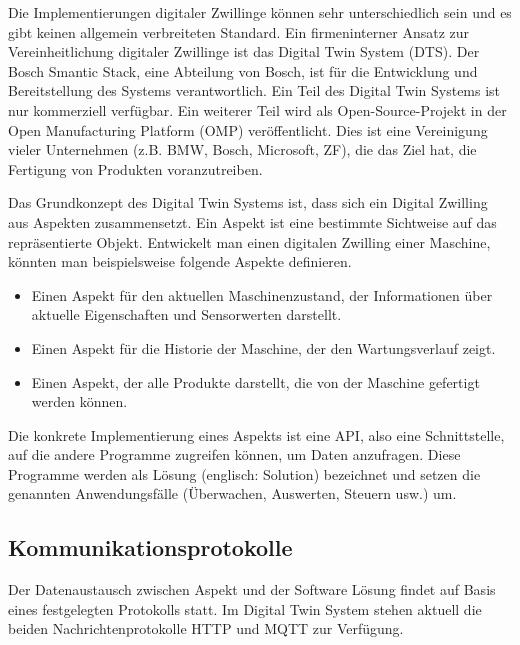 Die Implementierungen digitaler Zwillinge können sehr unterschiedlich sein und es gibt keinen allgemein verbreiteten Standard. Ein firmeninterner Ansatz zur Vereinheitlichung digitaler Zwillinge ist das Digital Twin System (DTS). Der Bosch Smantic Stack, eine Abteilung von Bosch, ist für die Entwicklung und Bereitstellung des Systems verantwortlich. Ein Teil des Digital Twin Systems ist nur kommerziell verfügbar. Ein weiterer Teil wird als Open-Source-Projekt in der Open Manufacturing Platform (OMP) veröffentlicht. Dies ist eine Vereinigung vieler Unternehmen (z.B. BMW, Bosch, Microsoft, ZF), die das Ziel hat, die Fertigung von Produkten voranzutreiben. \cite[vgl.][]{omp2020omp}

Das Grundkonzept des Digital Twin Systems ist, dass sich ein Digital Zwilling aus Aspekten zusammensetzt. Ein Aspekt ist eine bestimmte Sichtweise auf das repräsentierte Objekt. Entwickelt man einen digitalen Zwilling einer Maschine, könnten man beispielsweise folgende Aspekte definieren. 
\begin{itemize}
	\item Einen Aspekt für den aktuellen Maschinenzustand, der Informationen über aktuelle Eigenschaften und Sensorwerten darstellt.
	\item Einen Aspekt für die Historie der Maschine, der den Wartungsverlauf zeigt.
	\item Einen Aspekt, der alle Produkte darstellt, die von der Maschine gefertigt werden können.
\end{itemize}

Die konkrete Implementierung eines Aspekts ist eine API, also eine Schnittstelle, auf die andere Programme zugreifen können, um Daten anzufragen. Diese Programme werden als Lösung (englisch: Solution) bezeichnet und setzen die genannten Anwendungsfälle (Überwachen, Auswerten, Steuern usw.) um.

\subsection{Kommunikationsprotokolle}

Der Datenaustausch zwischen Aspekt und der Software Lösung findet auf Basis eines festgelegten Protokolls statt. Im Digital Twin System stehen aktuell die beiden Nachrichtenprotokolle HTTP und MQTT zur Verfügung. 

